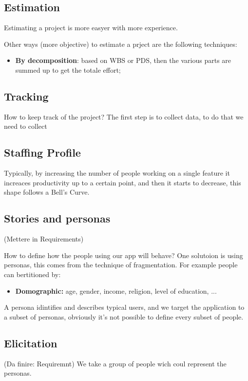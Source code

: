 \documentclass[12pt]{article}
\begin{document}
\subsection{Estimation}
Estimating a project is more easyer with more experience.

Other ways (more objective) to estimate a prject are the following techniques: 
\begin{itemize}
  \item \textbf{By decomposition}: based on WBS or PDS, then the various parts are summed up to get the totale effort;
\end{itemize}



\subsection{Tracking}
How to keep track of the project? The first step is to collect data, to do that we need to collect 


\subsection{Staffing Profile}
Typically, by increasing the number of people working on a single feature it increaces productivity up to a certain point, and then it starts to decrease, this shape follows a Bell's Curve.


\subsection{Stories and personas}
(Mettere in Requirements)

How to define how the people using our app will behave? One solutoion is using personas, this comes from the technique of fragmentation. For example people can bertitioned by:
\begin{itemize}
  \item \textbf{Domographic:} age, gender, income, religion, level of education, ...
\end{itemize}
A persona idintifies and describes typical users, and we target the application to a subset of personas, obviously it's not possible to define every subset of people.

\subsection{Elicitation}
(Da finire: Requiremnt)
We take a group of people wich coul represent the personas.
\end{document}
